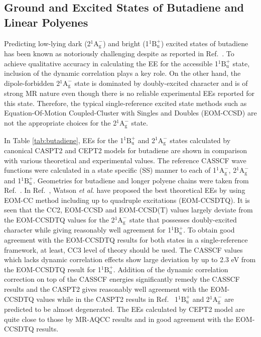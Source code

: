 \documentclass[aip,jcp,amsmath]{revtex4-1}
\begin{document}
\subsection{Ground and Excited States of Butadiene and Linear Polyenes}

%
Predicting low-lying dark (2${}^1\text{A}_\text{g}^{-}$) and bright (1${}^1\text{B}_\text{u}^{+}$) excited states of butadiene has been known as notoriously challenging despite as reported in Ref.~.
%
To achieve qualitative accuracy in calculating the EE for the accessible 1${}^1\text{B}_\text{u}^{+}$ state, inclusion of the dynamic correlation plays a key role.
%
On the other hand, the dipole-forbidden 2${}^1\text{A}_\text{g}^{-}$ state is dominated by doubly-excited character and is of strong MR nature even though there is no reliable experimental EEs reported for this state.
%
%
Therefore, the typical single-reference excited state methods such as Equation-Of-Motion Coupled-Cluster with Singles and Doubles (EOM-CCSD) are not the appropriate choices for the 2${}^1\text{A}_\text{g}^{-}$ state.

%
In Table \ref{tab:butadiene}, EEs for the 1${}^1\text{B}_\text{u}^{+}$ and 2${}^1\text{A}_\text{g}^{-}$ states calculated by canonical CASPT2 and CEPT2 models for butadiene are shown in comparison with various theoretical and experimental values.
%
The reference CASSCF wave functions were calculated in a state specific (SS) manner to each of 1${}^1\text{A}_\text{g}^{-}$, 2${}^1\text{A}_\text{g}^{-}$ and 1${}^1\text{B}_\text{u}^{+}$.
%
Geometries for butadiene and longer polyene chains were taken from Ref.~.
%
In Ref.~, Watson {\it et al.} have proposed the best theoretical EEs by using EOM-CC method including up to quadruple excitations (EOM-CCSDTQ).
%
It is seen that the CC2, EOM-CCSD and EOM-CCSD(T) values largely deviate from the EOM-CCSDTQ values for the 2${}^1\text{A}_\text{g}^{-}$ state that possesses doubly-excited character while giving reasonably well agreement for 1${}^1\text{B}_\text{u}^{+}$.
%
To obtain good agreement with the EOM-CCSDTQ results for both states in a single-reference framework, at least, CC3 level of theory should be used.
%
The CASSCF values which lacks dynamic correlation effects show large deviation by up to 2.3 eV from the EOM-CCSDTQ result for 1${}^1\text{B}_\text{u}^{+}$.
%
Addition of the dynamic correlation correction on top of the CASSCF energies significantly remedy the CASSCF results and the CASPT2 gives reasonably well agreement with the EOM-CCSDTQ values while in the CASPT2 results in Ref.~ 1${}^1\text{B}_\text{u}^{+}$ and 2${}^1\text{A}_\text{g}^{-}$ are predicted to be almost degenerated.
%
The EEs calculated by CEPT2 model are quite close to those by MR-AQCC results and in good agreement with the EOM-CCSDTQ results.
\end{document}
